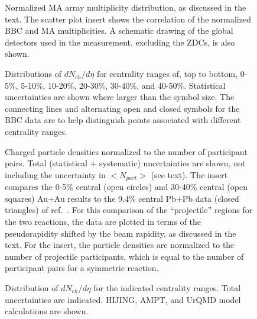 \documentclass[singlespacing]{elsart}
\begin{document}
\newpage
\begin{figure}[htp]
\caption{
Normalized MA array multiplicity distribution, as discussed in the text.
The scatter plot insert shows the correlation of the
normalized BBC and MA multiplicities.   
A schematic drawing of the global detectors
used in the measurement, excluding the ZDCs, is also
shown.
}
\label{mult}
\end{figure}
\newpage
\begin{figure}
\caption{
Distributions of  $dN_{ch}/d\eta$ for centrality ranges of,
top to bottom, 0-5\%, 5-10\%, 10-20\%, 20-30\%, 30-40\%, and
40-50\%. 
Statistical uncertainties are shown where larger than the symbol size.
The connecting lines and alternating open and closed symbols for the
BBC data are to help distinguish points associated with 
different centrality ranges. 
 }
\label{dndeta}  
\end{figure}
\newpage
\begin{figure}
\caption{
Charged particle densities normalized to the number of
participant pairs.  Total (statistical + systematic) uncertainties are shown,
not including the uncertainty in $<N_{part}>$ (see text).
The insert compares the 0-5\% central (open circles) and
30-40\% central (open squares) Au+Au results to the 9.4\% central 
Pb+Pb data (closed triangles)  of ref.~\cite{deines00}. 
For this comparison of the ``projectile'' regions for the two reactions, 
the data are plotted in terms of the  pseudorapidity shifted by the 
beam rapidity, as discussed in the text. For the insert, the
particle densities are normalized to the number of projectile 
participants, which is equal to the number of participant pairs for a 
symmetric reaction.
}
\label{dndeta_fragment}  
\end{figure}
\newpage
\begin{figure}
\caption{
Distribution of  $dN_{ch}/d\eta$ for the indicated centrality
ranges.  Total uncertainties are indicated.
HIJING, AMPT, and UrQMD model calculations are shown. 
}
\label{dndeta_models}  
\end{figure}
\end{document}
